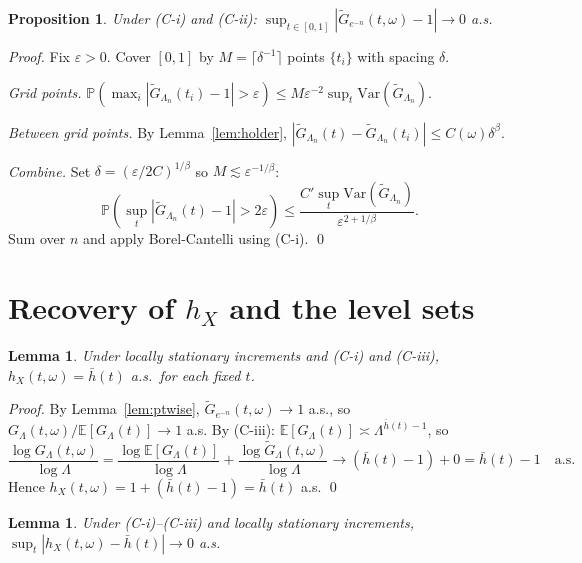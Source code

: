 \documentclass[10pt,a4paper]{amsart}
\newtheorem{lemma}[theorem]{Lemma}
\newtheorem{proposition}[theorem]{Proposition}
\newcommand{\E}{\mathbb{E}}
\newcommand{\GL}{G_\Lambda}
\newcommand{\hb}{\bar{h}}
\begin{document}
\begin{proposition}\label{prop:unif}
Under (C-i) and (C-ii): $\sup_{t\in[0,1]}|\tilde G_{e^{-n}}(t,\omega)-1|
\to0$ a.s.
\end{proposition}

\begin{proof}
Fix $\varepsilon>0$. Cover $[0,1]$ by $M=\lceil\delta^{-1}\rceil$
points $\{t_i\}$ with spacing $\delta$.

\emph{Grid points.}
$\mathbb{P}(\max_i|\tilde G_{\Lambda_n}(t_i)-1|>\varepsilon)
\le M\varepsilon^{-2}\sup_t\mathrm{Var}(\tilde G_{\Lambda_n})$.

\emph{Between grid points.}
By Lemma~\ref{lem:holder}, $|\tilde G_{\Lambda_n}(t)-\tilde G_{\Lambda_n}(t_i)|
\le C(\omega)\delta^\beta$.

\emph{Combine.}
Set $\delta=(\varepsilon/2C)^{1/\beta}$ so $M\lesssim\varepsilon^{-1/\beta}$:
\[
  \mathbb{P}\!\left(\sup_t|\tilde G_{\Lambda_n}(t)-1|>2\varepsilon\right)
  \le\frac{C'\sup_t\mathrm{Var}(\tilde G_{\Lambda_n})}{\varepsilon^{2+1/\beta}}.
\]
Sum over $n$ and apply Borel-Cantelli using (C-i). \qed
\end{proof}

\section{Recovery of $h_X$ and the level sets}

\begin{lemma}\label{lem:ptrecover}
Under locally stationary increments and (C-i) and (C-iii),
$h_X(t,\omega)=\hb(t)$ a.s.\ for each fixed $t$.
\end{lemma}

\begin{proof}
By Lemma~\ref{lem:ptwise}, $\tilde G_{e^{-n}}(t,\omega)\to1$ a.s.,
so $\GL(t,\omega)/\E[\GL(t)]\to1$ a.s. By (C-iii):
$\E[\GL(t)]\asymp\Lambda^{\hb(t)-1}$, so
\[
  \frac{\log\GL(t,\omega)}{\log\Lambda}
  = \frac{\log\E[\GL(t)]}{\log\Lambda}
  + \frac{\log\tilde G_\Lambda(t,\omega)}{\log\Lambda}
  \to(\hb(t)-1)+0 = \hb(t)-1\quad\text{a.s.}
\]
Hence $h_X(t,\omega)=1+(\hb(t)-1)=\hb(t)$ a.s. \qed
\end{proof}

\begin{lemma}\label{lem:unifrecover}
Under (C-i)--(C-iii) and locally stationary increments,
$\sup_t|h_X(t,\omega)-\hb(t)|\to0$ a.s.
\end{lemma}
\end{document}
